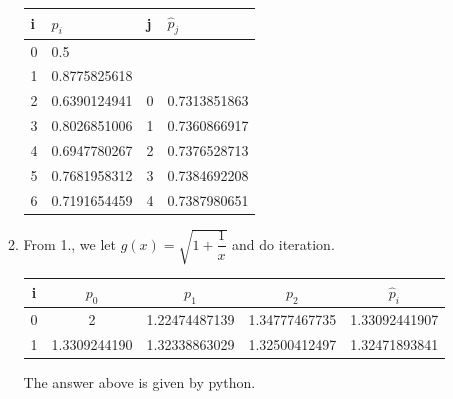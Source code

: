 \documentclass[12pt]{article}
\begin{document}
\begin{enumerate}
\begin{enumerate}
        \begin{center}
            \begin{tabular}{|p{1cm}|p{3cm}||p{1cm}|p{3cm}|}
                \hline
                i & $p_i$ & j & $\hat{p}_j$\\
                \hline
                0 & 0.5 & &\\
                1 & 0.8775825618 & &\\
                2 & 0.6390124941 & 0 & 0.7313851863\\
                3 & 0.8026851006 & 1 & 0.7360866917\\
                4 & 0.6947780267 & 2 & 0.7376528713\\
                5 & 0.7681958312 & 3 & 0.7384692208\\
                6 & 0.7191654459 & 4 & 0.7387980651\\
                \hline
            \end{tabular}
        \end{center}

        \item From 1., we let $g(x) = \sqrt{1 + \dfrac{1}{x}}$ and do iteration.
        
        \begin{center}
            \begin{tabular}{|c|c|c|c||c|}
                \hline
                i & $p_0$ & $p_1$ & $p_2$ & $\hat{p}_i$ \\
                \hline
                0 & 2 & 1.22474487139 & 1.34777467735 & 1.33092441907\\
                1 & 1.3309244190 & 1.32338863029 & 1.32500412497 & 1.32471893841\\
                \hline
            \end{tabular}
        \end{center}

        The answer above is given by python.


\end{enumerate}
\end{enumerate}
\end{document}
